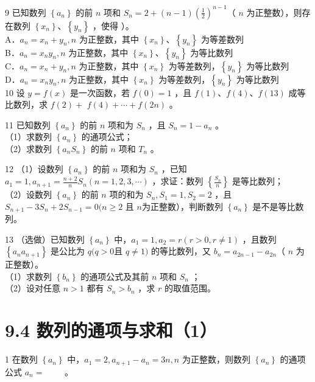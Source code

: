 \documentclass[10pt]{article}
\begin{document}
9 已知数列 \(\left\{a_{n}\right\}\) 的前 \(n\) 项和 \(S_{n}=2+(n-1)\left(\frac{1}{2}\right)^{n-1}\)（ \(n\) 为正整数），则存在数列 \(\left\{x_{n}\right\} 、\left\{y_{n}\right\}\) ，使得 ）。\\
A．\(a_{n}=x_{n}+y_{n}, n\) 为正整数，其中 \(\left\{x_{n}\right\} 、\left\{y_{n}\right\}\) 为等差数列\\
B．\(a_{n}=x_{n} y_{n}, n\) 为正整数，其中 \(\left\{x_{n}\right\} 、\left\{y_{n}\right\}\) 为等比数列\\
C．\(a_{n}=x_{n}+y_{n}, n\) 为正整数，其中 \(\left\{x_{n}\right\}\) 为等差数列，\(\left\{y_{n}\right\}\) 为等比数列\\
D．\(a_{n}=x_{n} y_{n}, n\) 为正整数，其中 \(\left\{x_{n}\right\}\) 为等差数列，\(\left\{y_{n}\right\}\) 为等比数列\\
10 设 \(y=f(x)\) 是一次函数，若 \(f(0)=1\) ，且 \(f(1) 、 f(4) 、 f(13)\) 成等比数列，求 \(f(2)+\) \(f(4)+\cdots+f(2 n)\) 。

11 已知数列 \(\left\{a_{n}\right\}\) 的前 \(n\) 项和为 \(S_{n}\) ，且 \(S_{n}=1-a_{n}\) 。\\
（1）求数列 \(\left\{a_{n}\right\}\) 的通项公式；\\
（2）求数列 \(\left\{a_{n} S_{n}\right\}\) 的前 \(n\) 项和 \(T_{n}\) 。

12 （1）设数列 \(\left\{a_{n}\right\}\) 的前 \(n\) 项和为 \(S_{n}\) ，已知 \(a_{1}=1, a_{n+1}=\frac{n+2}{n} S_{n}(n=1,2,3, \cdots)\) ，求证：数列 \(\left\{\frac{S_{n}}{n}\right\}\) 是等比数列；\\
（2）设数列 \(\left\{a_{n}\right\}\) 的前 \(n\) 项的和为 \(S_{n}, S_{1}=1, S_{2}=2\) ，且 \(S_{n+1}-3 S_{n}+2 S_{n-1}=0(n \geqslant 2\) 且 \(n\)为正整数），判断数列 \(\left\{a_{n}\right\}\) 是不是等比数列。

13 （选做）已知数列 \(\left\{a_{n}\right\}\) 中，\(a_{1}=1, a_{2}=r(r>0, r \neq 1)\) ，且数列 \(\left\{a_{n} a_{n+1}\right\}\) 是公比为 \(q(q>0\)且 \(q \neq 1)\) 的等比数列，又 \(b_{n}=a_{2 n-1}-a_{2 n}\)（ \(n\) 为正整数）。\\
（1）求数列 \(\left\{b_{n}\right\}\) 的通项公式及其前 \(n\) 项和 \(S_{n}\) ；\\
（2）设对任意 \(n>1\) 都有 \(S_{n}>b_{n}\) ，求 \(r\) 的取值范围。

\section*{9.4 数列的通项与求和（1）}
1 在数列 \(\left\{a_{n}\right\}\) 中，\(a_{1}=2, a_{n+1}-a_{n}=3 n, n\) 为正整数，则数列 \(\left\{a_{n}\right\}\) 的通项公式 \(a_{n}=\) \(\qquad\)。
\end{document}
